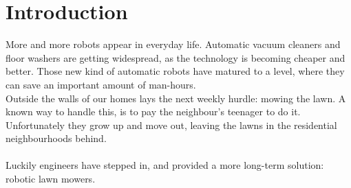 \chapter{Introduction}
More and more robots appear in everyday life. Automatic vacuum cleaners and floor washers are getting widespread, as the technology is becoming cheaper and better. Those new kind of automatic robots have matured to a level, where they can save an important amount of man-hours.\\

Outside the walls of our homes lays the next weekly hurdle: mowing the lawn. A known way to handle this, is to pay the neighbour's teenager to do it. Unfortunately they grow up and move out, leaving the lawns in the residential neighbourhoods behind.\\\\
Luckily engineers have stepped in, and provided a more long-term solution: robotic lawn mowers.